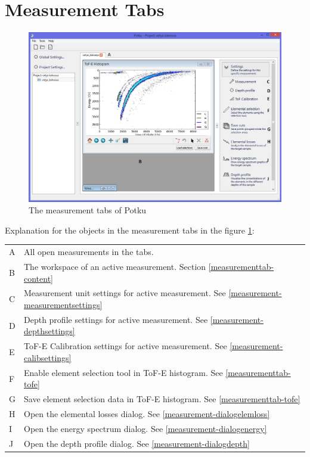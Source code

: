 \documentclass{scrreprt}
\begin{document}
\section{Measurement Tabs}\label{measurementtab}
\begin{figure}[H]
\centering
\includegraphics[width=140mm]{mainwindow-measurementtab}
\caption{The measurement tabs of Potku}
\label{fig-measurementtab}
\end{figure}
Explanation for the objects in the measurement tabs in the figure \ref{fig-measurementtab}:

\begin{tabular}{ll}
A & All open measurements in the tabs.\\
B & The workspace of an active measurement. Section \ref{measurementtab-content}\\
C & Measurement unit settings for active measurement. See \ref{measurement-measurementsettings}\\
D & Depth profile settings for active measurement. See \ref{measurement-depthsettings}\\
E & ToF-E Calibration settings for active measurement. See \ref{measurement-calibsettings}\\
F & Enable element selection tool in ToF-E histogram. See \ref{measurementtab-tofe}\\
G & Save element selection data in ToF-E histogram. See \ref{measurementtab-tofe}\\
H & Open the elemental losses dialog. See \ref{measurement-dialogelemloss}\\
I & Open the energy spectrum dialog. See \ref{measurement-dialogenergy}\\
J & Open the depth profile dialog. See \ref{measurement-dialogdepth}\\
\end{tabular}
\end{document}
